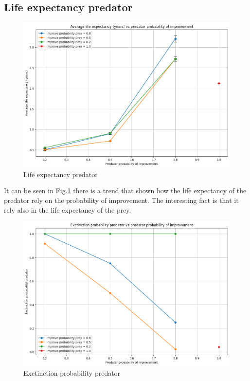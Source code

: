 \documentclass[conference]{IEEEtran}
\begin{document}
    \subsection{Life expectancy predator}

    \begin{figure}[!ht]
    \centering
    \includegraphics[width=\columnwidth]{media/lf_predator.png}
    \caption[short]{Life expectancy predator}
    \label{fig:lf_predator}
    \end{figure}

    It can be seen in Fig.\ref{fig:lf_predator} there is a trend that shown how the life expectancy of the predator rely on the probability of improvement. The interesting fact is that  it rely also in the life expectancy of the prey. 


    \begin{figure}[!ht]
    \centering
    \includegraphics[width=\columnwidth]{media/exctinct_prob_predator.png}
    \caption[short]{Exctinction probability predator}
    \label{fig:ex_predator}
    \end{figure}
\end{document}
